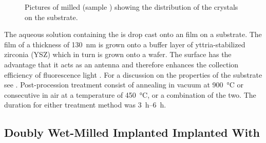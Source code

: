 		\begin{figure}[!htb]
			\centering
			\caption[Distribution of \nds on-top of an \ir substrate]{Pictures of milled \nds (sample \insituH) showing the distribution of the \nd crystals on the \ir substrate.}
			 \label{fig::sem_milled}
		\end{figure}

		The aqueous solution containing the \nds is drop cast onto an \ir film on a \Si substrate.
		The \ir film of a thickness of \SI{130}{nm} is grown onto a buffer layer of yttria-stabilized zirconia (YSZ) which in turn is grown onto a \Si wafer.
		The \ir surface has the advantage that it acts as an antenna and therefore enhances the collection efficiency of fluorescence light \cite{Neu2012a}. For a discussion on the properties of the substrate see .
		Post-procession treatment consist of annealing in vacuum at \SI{900}{\degreeCelsius} or consecutive \ox in air at a temperature of \SI{450}{\degreeCelsius}, or a combination of the two.
		The duration for either treatment method was \SIrange{3}{6}{\hour}.

	\subsection{Doubly Wet-Milled Implanted \Nds Implanted With \Si}\label{subsec::2_milled_nds}

